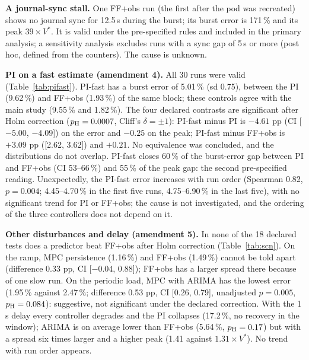 \documentclass[journal]{IEEEtran}
\begin{document}
\textbf{A journal-sync stall.} One FF+obs run (the first after the pod was recreated) shows no journal sync for 12.5\,s during the burst; its burst error is 171\,\% and its peak $39\times V^*$. It is valid under the pre-specified rules and included in the primary analysis; a sensitivity analysis excludes runs with a sync gap of 5\,s or more (post hoc, defined from the counters). The cause is unknown.

\textbf{PI on a fast estimate (amendment 4).} All 30 runs were valid (Table~\ref{tab:pifast}). PI-fast has a burst error of 5.01\,\% (sd 0.75), between the PI (9.62\,\%) and FF+obs (1.93\,\%) of the same block; these controls agree with the main study (9.55\,\% and 1.82\,\%). The four declared contrasts are significant after Holm correction ($p_{\rm H}=0.0007$, Cliff's $\delta=\pm1$): PI-fast minus PI is $-4.61$ pp (CI [$-5.00$, $-4.09$]) on the error and $-0.25$ on the peak; PI-fast minus FF+obs is $+3.09$ pp ([2.62, 3.62]) and $+0.21$. No equivalence was concluded, and the distributions do not overlap. PI-fast closes 60\,\% of the burst-error gap between PI and FF+obs (CI 53--66\,\%) and 55\,\% of the peak gap: the second pre-specified reading. Unexpectedly, the PI-fast error increases with run order (Spearman 0.82, $p=0.004$; 4.45--4.70\,\% in the first five runs, 4.75--6.90\,\% in the last five), with no significant trend for PI or FF+obs; the cause is not investigated, and the ordering of the three controllers does not depend on it.


\textbf{Other disturbances and delay (amendment 5).} In none of the 18 declared tests does a predictor beat FF+obs after Holm correction (Table~\ref{tab:scn}). On the ramp, MPC persistence (1.16\,\%) and FF+obs (1.49\,\%) cannot be told apart (difference 0.33 pp, CI [$-0.04$, 0.88]); FF+obs has a larger spread there because of one slow run. On the periodic load, MPC with ARIMA has the lowest error (1.95\,\% against 2.47\,\%; difference 0.53 pp, CI [0.26, 0.79], unadjusted $p=0.005$, $p_{\rm H}=0.084$): suggestive, not significant under the declared correction. With the 1\,s delay every controller degrades and the PI collapses (17.2\,\%, no recovery in the window); ARIMA is on average lower than FF+obs (5.64\,\%, $p_{\rm H}=0.17$) but with a spread six times larger and a higher peak (1.41 against $1.31\times V^*$). No trend with run order appears.

\end{document}
